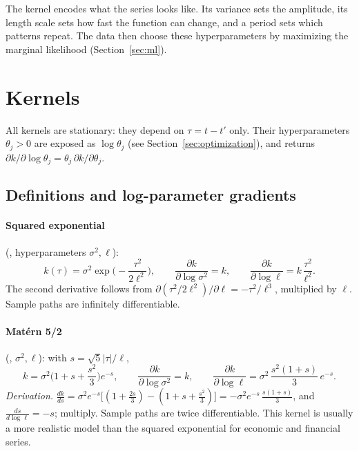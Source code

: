 \documentclass[11pt,a4paper]{article}
\begin{document}
The kernel encodes what the series looks like. Its variance sets the amplitude,
its length scale sets how fast the function can change, and a period sets which
patterns repeat. The data then choose these hyperparameters by maximizing the
marginal likelihood (Section~\ref{sec:ml}).

\section{Kernels}

All  kernels are stationary: they depend on $\tau=t-t'$ only.
Their hyperparameters $\theta_j>0$ are exposed as $\log\theta_j$ (see
Section~\ref{sec:optimization}), and  returns
$\partial k/\partial\log\theta_j=\theta_j\,\partial k/\partial\theta_j$.

\subsection{Definitions and log-parameter gradients}

\paragraph{Squared exponential} (, hyperparameters $\sigma^2,\ell$):
\[
  k(\tau)=\sigma^2\exp\!\Big(-\frac{\tau^2}{2\ell^2}\Big),\qquad
  \frac{\partial k}{\partial\log\sigma^2}=k,\qquad
  \frac{\partial k}{\partial\log\ell}=k\,\frac{\tau^2}{\ell^2}.
\]
The second derivative follows from $\partial(\tau^2/2\ell^2)/\partial\ell=-\tau^2/\ell^3$,
multiplied by $\ell$. Sample paths are infinitely differentiable.

\paragraph{Matérn 5/2} (, $\sigma^2,\ell$): with $s=\sqrt5|\tau|/\ell$,
\[
  k=\sigma^2\Big(1+s+\frac{s^2}{3}\Big)e^{-s},\qquad
  \frac{\partial k}{\partial\log\sigma^2}=k,\qquad
  \frac{\partial k}{\partial\log\ell}=\sigma^2\,\frac{s^2(1+s)}{3}\,e^{-s}.
\]
\emph{Derivation.} $\frac{dk}{ds}=\sigma^2e^{-s}\big[(1+\tfrac{2s}{3})-(1+s+\tfrac{s^2}{3})\big]
=-\sigma^2e^{-s}\,\tfrac{s(1+s)}{3}$, and $\frac{ds}{d\log\ell}=-s$; multiply.
Sample paths are twice differentiable. This kernel is usually a more realistic model than the squared exponential
for economic and financial series.
\end{document}
